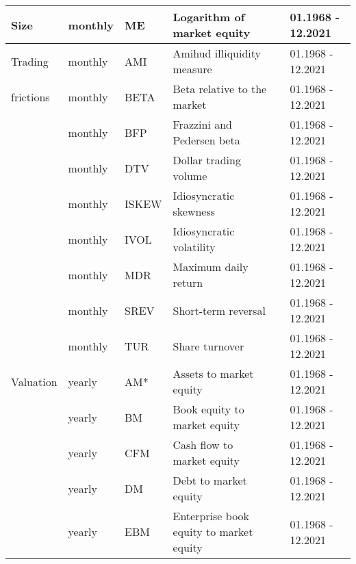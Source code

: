 \begin{landscape}
{\begin{ThreePartTable}
\begin{center}
\begin{footnotesize}
\begin{longtabu}{p{2.4cm} p{2cm} p{1.6cm} p{8.5cm} p{5.7cm} p{3.2cm}}
                        \hline 
						\rule{0pt}{2ex}
						Size & monthly & ME & Logarithm of market equity  & \cite{ba/1981} & 01.1968 - 12.2021  \\
                        \hline 
                        \rule{0pt}{2ex}
						  Trading & monthly & AMI & Amihud illiquidity measure & \cite{am/2002} & 01.1968 - 12.2021  \\
                        \rule{0pt}{1ex}
						  frictions & monthly & BETA & Beta relative to the market  & \cite{fa/ma/1973} & 01.1968 - 12.2021  \\
                        \rule{0pt}{1ex}
						  & monthly & BFP & Frazzini and Pedersen beta  & \cite{fr/pe/2014} & 01.1968 - 12.2021 \\
                        \rule{0pt}{1ex}
						  & monthly & DTV  & Dollar trading volume  & \cite{br/ch/su/1998} & 01.1968 - 12.2021 \\
                        \rule{0pt}{1ex}
						  & monthly & ISKEW  & Idiosyncratic skewness & \cite{ba/en/mu/2016} & 01.1968 - 12.2021  \\
                        \rule{0pt}{1ex}
						  & monthly & IVOL  & Idiosyncratic volatility & \cite{an/ho/xi/zh/2006} & 01.1968 - 12.2021  \\
                        \rule{0pt}{1ex}
						  & monthly & MDR  & Maximum daily return & \cite{ba/ca/wh/2011} & 01.1968 - 12.2021  \\
                        \rule{0pt}{1ex}
						  & monthly & SREV  & Short-term reversal & \cite{je/1990} & 01.1968 - 12.2021  \\
                        \rule{0pt}{1ex}
						  & monthly & TUR  & Share turnover & \cite{da/na/ra/1998}  & 01.1968 - 12.2021 \\       
                        \hline 
                        \rule{0pt}{2ex}
						Valuation & yearly & AM* & Assets to market equity & \cite{fa/fr/1992} & 01.1968 - 12.2021  \\
						\rule{0pt}{1ex}
						  & yearly & BM & Book equity to market equity & \cite{da/fa/fr/2000} & 01.1968 - 12.2021  \\
						\rule{0pt}{1ex}
						  & yearly & CFM & Cash flow to market equity & \cite{la/sh/vi/1994} & 01.1968 - 12.2021  \\
                        \rule{0pt}{1ex}
						  & yearly & DM & Debt to market equity & \cite{bh/1988} & 01.1968 - 12.2021 \\
                        \rule{0pt}{1ex}
						  & yearly & EBM & Enterprise book equity to market equity & \cite{pe/ri/tu/2007} & 01.1968 - 12.2021 \\

\end{longtabu}
\end{footnotesize}
\end{center}
\end{ThreePartTable}}
\end{landscape}
